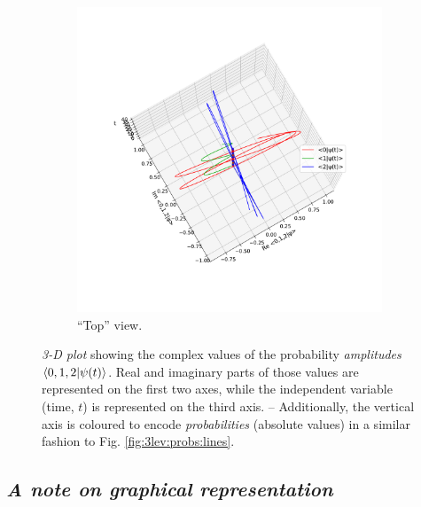 \begin{figure}[]
\begin{subfigure}[b]{\textwidth}
    \includegraphics[height=0.41\textheight,clip,trim= 20 120 20 220]{img/3ldetect/hermitianSpaceTime_top.pdf}
    \caption{``Top'' view.}
  \end{subfigure}
  \caption{
    \textit{3-D plot} showing the complex values of the
    probability \emph{amplitudes} $\braket{0, 1, 2}{\psi(t)}$.
    Real and imaginary parts of those values are represented on
    the first two axes, while the independent variable (time, $t$)
    is represented
    on the third axis.
    -- Additionally, the vertical axis is coloured to encode \emph{probabilities}
    (absolute values)
    in a similar fashion to Fig. \ref{fig:3lev:probs:lines}. 
  }
  \label{fig:3lev:hermitianEvol}
\end{figure}

\subsection*{\textit{A note on graphical representation}}

